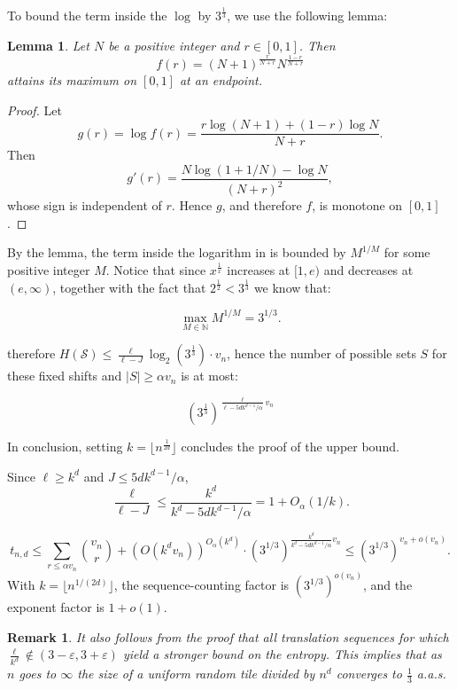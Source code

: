 \documentclass{article}
\newtheorem{lemma}[theorem]{Lemma}
\newtheorem{remark}[theorem]{Remark}
\begin{document}
To bound the term inside the $\log$ by $3^{\frac{1}{3}}$, we use the following lemma:

\begin{lemma}
    Let $N$ be a positive integer and $r \in [0,1]$. Then
    \[
        f(r)=(N+1)^{\frac{r}{N+r}}N^{\frac{1-r}{N+r}}
    \]
    attains its maximum on \([0,1]\) at an endpoint.
\end{lemma}

\begin{proof}
    Let
    \[
        g(r)=\log f(r)
        =\frac{r\log(N+1)+(1-r)\log N}{N+r}.
    \]
    Then
    \[
        g'(r)=\frac{N\log(1+1/N)-\log N}{(N+r)^2},
    \]
    whose sign is independent of \(r\). Hence \(g\), and therefore \(f\), is monotone on \([0,1]\).
\end{proof}

    By the lemma, the term inside the logarithm in  is bounded by
    \(M^{1/M}\) for some positive integer \(M\). Notice that since $x^{\frac{1}{x}}$ increases at $[1,e)$ and decreases at $(e,\infty)$, together with the fact that $2^{\frac{1}{2}}< 3^{\frac{1}{3}}$ we know that:
    
    \[
        \max_{M\in\mathbb N} M^{1/M}=3^{1/3}.
    \]

    \;
    
    \noindent therefore $H(\mathcal S) \leq \frac{\ell}{\ell-J} \log_2(3^{\frac{1}{3}}) \cdot v_n$, hence the number of possible sets \(S\) for these fixed shifts and $|S| \geq \alpha v_n$ is at most:
    
    \[\left(3^{\frac{1}{3}} \right)^{\frac{\ell}{\ell-5dk^{d-1}/\alpha}v_n}\]

\;

\noindent In conclusion, setting $k=\lfloor n^{\frac{1}{2d}}\rfloor$ concludes the proof of the upper bound.

Since \(\ell\ge k^d\) and \(J\le 5dk^{d-1}/\alpha\),
\[
    \frac{\ell}{\ell-J}
    \le
    \frac{k^d}{k^d-5dk^{d-1}/\alpha}
    =
    1+O_\alpha(1/k).
\]

\[
t_{n,d}
\le
\sum_{r\le \alpha v_n}\binom{v_n}{r}
+
(O(k^d v_n))^{O_\alpha(k^d)}
\cdot
\left(3^{1/3}\right)^{
    \frac{k^d}{k^d-5dk^{d-1}/\alpha}v_n
}
\le
(3^{1/3})^{v_n+o(v_n)}.
\]
With \(k=\lfloor n^{1/(2d)}\rfloor\), the sequence-counting factor is \((3^{1/3})^{o(v_n)}\), and the exponent factor is \(1+o(1)\).

\begin{remark}
    It also follows from the proof that all translation sequences for which $\frac{\ell}{k^d} \notin (3-\varepsilon, 3+\varepsilon)$ yield a stronger bound on the entropy. This implies that as $n$ goes to $\infty$ the size of a uniform random tile divided by $n^d$ converges to $\frac{1}{3}$ a.a.s. \end{remark}
\;
\end{document}
